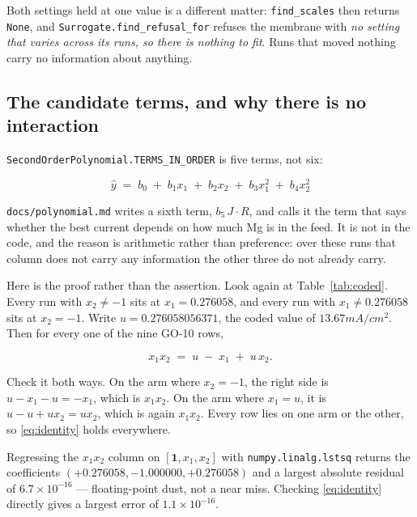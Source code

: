Both settings held at one value is a different matter: \texttt{find\_scales} then returns
\texttt{None}, and \texttt{Surrogate.find\_refusal\_for} refuses the membrane with \emph{no
setting that varies across its runs, so there is nothing to fit}. Runs that moved nothing carry
no information about anything.

\subsection{The candidate terms, and why there is no interaction}

\texttt{SecondOrderPolynomial.TERMS\_IN\_ORDER} is five terms, not six:

\begin{equation}
  \label{eq:polynomial}
  \hat{y} \;=\; b_0 \;+\; b_1 x_1 \;+\; b_2 x_2 \;+\; b_3 x_1^2 \;+\; b_4 x_2^2
\end{equation}

\texttt{docs/polynomial.md} writes a sixth term, $b_5 \, J \cdot R$, and calls it the term that
says whether the best current depends on how much Mg is in the feed. It is not in the code, and
the reason is arithmetic rather than preference: over these runs that column does not carry any
information the other three do not already carry.

Here is the proof rather than the assertion. Look again at Table~\ref{tab:coded}. Every run with
$x_2 \neq -1$ sits at $x_1 = 0.276058$, and every run with $x_1 \neq 0.276058$ sits at
$x_2 = -1$. Write $u = 0.276058056371$, the coded value of $13.67\unit{mA/cm^2}$. Then for every
one of the nine GO-10 rows,

\begin{equation}
  \label{eq:identity}
  x_1 x_2 \;=\; u \;-\; x_1 \;+\; u\,x_2 .
\end{equation}

Check it both ways. On the arm where $x_2 = -1$, the right side is $u - x_1 - u = -x_1$, which is
$x_1 x_2$. On the arm where $x_1 = u$, it is $u - u + u x_2 = u x_2$, which is again $x_1 x_2$.
Every row lies on one arm or the other, so \eqref{eq:identity} holds everywhere.

Regressing the $x_1 x_2$ column on $[\mathbf{1}, x_1, x_2]$ with \texttt{numpy.linalg.lstsq}
returns the coefficients $(+0.276058, -1.000000, +0.276058)$ and a largest absolute residual of
$6.7 \times 10^{-16}$ --- floating-point dust, not a near miss. Checking \eqref{eq:identity}
directly gives a largest error of $1.1 \times 10^{-16}$.

